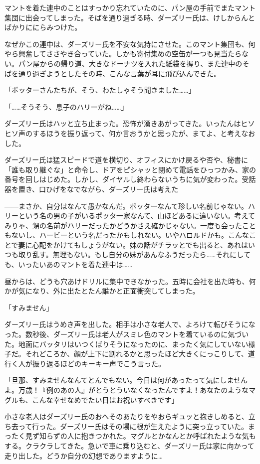 \documentclass[10pt,a4paper]{article}
\begin{document}
\begin{CJK}{UTF8}{min}
マントを着た連中のことはすっかり忘れていたのに、パン屋の手前でまたマント集団に出会ってしまった。そばを通り過ぎる時、ダーズリー氏は、けしからんとばかりににらみつけた。

なぜかこの連中は、ダーズリー氏を不安な気持にさせた。このマント集団も、何やら興奮してささやき合っていた。しかも寄付集めの空缶が一つも見当たらない。パン屋からの帰り道、大きなドーナツを入れた紙袋を握り、また連中のそばを通り過ぎようとしたその時、こんな言葉が耳に飛び込んできた。

「ポッターさんたちが、そう、わたしゃそう聞きました……」

「……そうそう、息子のハリーがね……」

ダーズリー氏はハッと立ち止まった。恐怖が湧きあがってきた。いったんはヒソヒソ声のするほうを振り返って、何か言おうかと思ったが、まてよ、と考えなおした。

ダーズリー氏は猛スピードで道を横切り、オフィスにかけ戻るや否や、秘書に「誰も取り継ぐな」と命令し、ドアをピシャッと閉めて電話をひっつかみ、家の番号を回しはじめた。しかし、ダイヤルし終わらないうちに気が変わった。受話器を置き、口ひげをなでながら、ダーズリー氏は考えた

――まさか、自分はなんて愚かなんだ。ポッターなんて珍しい名前じゃない。ハリーという名の男の子がいるポッタ一家なんて、山ほどあるに違いない。考えてみりゃ、甥の名前がハリーだったかどうかさえ確かじゃない。一度も会ったこともないし、ハービーという名だったかもしれない。いやハロルドかも。こんなことで妻に心配をかけてもしょうがない。妹の話がチラッとでも出ると、あれはいつも取り乱す。無理もない。もし自分の妹があんなふうだったら……それにしても、いったいあのマントを着た連中は……

昼からは、どうも穴あけドリルに集中できなかった。五時に会社を出た時も、何かが気になり、外に出たとたん誰かと正面衝突してしまった。

「すみません」

ダーズリー氏はうめき声を出した。相手は小さな老人で、よろけて転びそうになった。数秒後、ダーズリー氏は老人がスミレ色のマントを着ているのに気づいた。地面にバッタリはいつくばりそうになったのに、まったく気にしていない様子だ。それどころか、顔が上下に割れるかと思ったほど大きくにっこりして、道行く人が振り返るほどのキーキー声でこう言った。

「旦那、すみませんなんてとんでもない。今日は何があったって気にしませんよ。万歳！『例のあの人』がとうとういなくなったんですよ！あなたのようなマグルも、こんな幸せなめでたい日はお祝いすべきです」

小さな老人はダーズリー氏のおへそのあたりをやおらギュッと抱きしめると、立ち去って行った。ダーズリー氏はその場に根が生えたように突っ立っていた。まったく見ず知らずの人に抱きつかれた。マグルとかなんとか呼ばれたような気もする。クラクラしてきた。急いで車に乗り込むと、ダーズリー氏は家に向かって走り出した。どうか自分の幻想でありますように…


\end{CJK}
\end{document}
